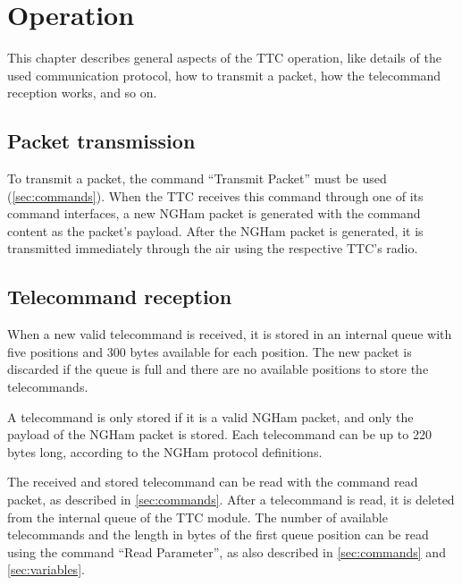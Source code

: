 %
%
%
%
%

%
%
%
%
%


\chapter{Operation} \label{ch:operation}

This chapter describes general aspects of the TTC operation, like details of the used communication protocol, how to transmit a packet, how the telecommand reception works, and so on.

\section{Packet transmission}

To transmit a packet, the command ``Transmit Packet'' must be used (\autoref{sec:commands}). When the TTC receives this command through one of its command interfaces, a new NGHam packet is generated with the command content as the packet's payload. After the NGHam packet is generated, it is transmitted immediately through the air using the respective TTC's radio.

\section{Telecommand reception}

When a new valid telecommand is received, it is stored in an internal queue with five positions and 300 bytes available for each position. The new packet is discarded if the queue is full and there are no available positions to store the telecommands.

A telecommand is only stored if it is a valid NGHam packet, and only the payload of the NGHam packet is stored. Each telecommand can be up to 220 bytes long, according to the NGHam protocol definitions.

The received and stored telecommand can be read with the command read packet, as described in \autoref{sec:commands}. After a telecommand is read, it is deleted from the internal queue of the TTC module. The number of available telecommands and the length in bytes of the first queue position can be read using the command ``Read Parameter'', as also described in \autoref{sec:commands} and \ref{sec:variables}.

